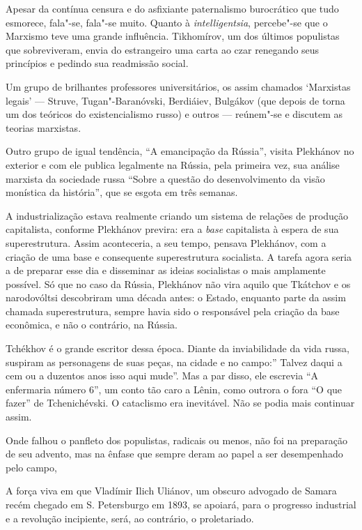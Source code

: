 Apesar da contínua censura e do asfixiante paternalismo burocrático que
tudo esmorece, fala"-se, fala"-se muito. Quanto à \emph{intelligentsia},
percebe"-se que o Marxismo teve uma grande influência. Tikhomírov, um dos
últimos populistas que sobreviveram, envia do estrangeiro uma carta ao
czar renegando seus princípios e pedindo sua readmissão social.

Um grupo de brilhantes professores universitários, os assim chamados
`Marxistas legais' --- Struve, Tugan"-Baranóvski, Berdiáiev, Bulgákov (que
depois de torna um dos teóricos do existencialismo russo) e outros ---
reúnem"-se e discutem as teorias marxistas.

Outro grupo de igual tendência, ``A emancipação da Rússia'', visita
Plekhánov no exterior e com ele publica legalmente na Rússia, pela
primeira vez, sua análise marxista da sociedade russa ``Sobre a questão
do desenvolvimento da visão monística da história'', que se esgota em
três semanas.

A industrialização estava realmente criando um sistema de relações de
produção capitalista, conforme Plekhánov previra: era a \emph{base}
capitalista à espera de sua superestrutura. Assim aconteceria, a seu
tempo, pensava Plekhánov, com a criação de uma base e consequente
superestrutura socialista. A tarefa agora seria a de preparar esse dia e
disseminar as ideias socialistas o mais amplamente possível. Só que no
caso da Rússia, Plekhánov não vira aquilo que Tkátchov e os narodovóltsi
descobriram uma década antes: o Estado, enquanto parte da assim chamada
superestrutura, sempre havia sido o responsável pela criação da base
econômica, e não o contrário, na Rússia.

Tchékhov é o grande escritor dessa época. Diante da inviabilidade da
vida russa, suspiram as personagens de suas peças, na cidade e no
campo:'' Talvez daqui a cem ou a duzentos anos isso aqui mude''. Mas a
par disso, ele escrevia ``A enfermaria número 6'', um conto tão caro a
Lênin, como outrora o fora ``O que fazer'' de Tchenichévski. O
cataclismo era inevitável. Não se podia mais continuar assim.

Onde falhou o panfleto dos populistas, radicais ou menos, não foi na
preparação de seu advento, mas na ênfase que sempre deram ao papel a ser
desempenhado pelo campo,

A força viva em que Vladímir Ilich Uliánov, um obscuro advogado de
Samara recém chegado em S. Petersburgo em 1893, se apoiará, para o
progresso industrial e a revolução incipiente, será, ao contrário, o
proletariado.

